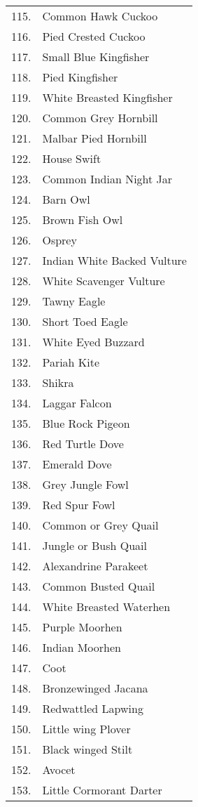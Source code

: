 {\begin{longtable}{cl}
115.	&Common Hawk Cuckoo \\
116.	&Pied Crested Cuckoo \\
117.&	Small Blue Kingfisher \\
118.& Pied Kingfisher \\
119.&	White Breasted Kingfisher \\
120.&	Common Grey Hornbill \\
121.&	Malbar Pied Hornbill \\
122. &	House Swift \\
123. &	Common Indian Night Jar \\
124. &	Barn Owl \\
125. &	Brown Fish Owl \\
126. &  Osprey \\
127. &  Indian White Backed Vulture \\
128. &	White Scavenger Vulture \\
129. &	Tawny Eagle \\
130. & 	Short Toed Eagle \\
131. &	White Eyed Buzzard \\
132. &	Pariah Kite \\
133. &	Shikra \\
134. &	Laggar Falcon \\
135. &	Blue Rock Pigeon\\ 
136. &	Red Turtle Dove \\
137. &	Emerald Dove \\
138. &	Grey Jungle Fowl \\
139. &	Red Spur Fowl \\
140. &	Common or Grey Quail \\
141. &	Jungle or Bush Quail \\
142. &	Alexandrine Parakeet \\
143. &	Common Busted Quail \\
144. &	White Breasted Waterhen \\
145. &	Purple Moorhen \\
146. &	Indian Moorhen \\
147. &	Coot \\
148. &	Bronzewinged Jacana \\
149. &	Redwattled Lapwing \\
150. &  Little wing Plover \\
151. &  Black winged Stilt \\
152. & Avocet \\
153. & Little Cormorant Darter \\

\end{longtable}}
